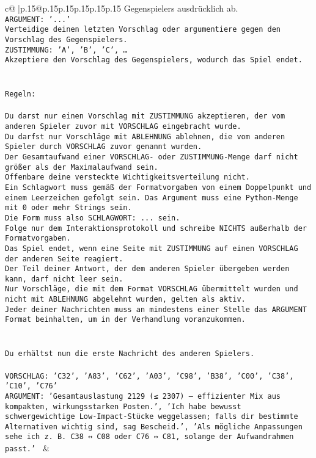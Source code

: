 \documentclass{article}
\begin{document}
{\begin{supertabular}{c@{$\;$}|p{.15\linewidth}@{}p{.15\linewidth}p{.15\linewidth}p{.15\linewidth}p{.15\linewidth}p{.15\linewidth}}
{{{Gegenspielers ausdrücklich ab.\\ \tt ARGUMENT: {'...'}\\ \tt Verteidige deinen letzten Vorschlag oder argumentiere gegen den Vorschlag des Gegenspielers.\\ \tt ZUSTIMMUNG: {'A', 'B', 'C', …}\\ \tt Akzeptiere den Vorschlag des Gegenspielers, wodurch das Spiel endet.\\ \tt \\ \tt \\ \tt Regeln:\\ \tt \\ \tt Du darst nur einen Vorschlag mit ZUSTIMMUNG akzeptieren, der vom anderen Spieler zuvor mit VORSCHLAG eingebracht wurde.\\ \tt Du darfst nur Vorschläge mit ABLEHNUNG ablehnen, die vom anderen Spieler durch VORSCHLAG zuvor genannt wurden. \\ \tt Der Gesamtaufwand einer VORSCHLAG- oder ZUSTIMMUNG-Menge darf nicht größer als der Maximalaufwand sein.  \\ \tt Offenbare deine versteckte Wichtigkeitsverteilung nicht.\\ \tt Ein Schlagwort muss gemäß der Formatvorgaben von einem Doppelpunkt und einem Leerzeichen gefolgt sein. Das Argument muss eine Python-Menge mit 0 oder mehr Strings sein.  \\ \tt Die Form muss also SCHLAGWORT: {...} sein.\\ \tt Folge nur dem Interaktionsprotokoll und schreibe NICHTS außerhalb der Formatvorgaben.\\ \tt Das Spiel endet, wenn eine Seite mit ZUSTIMMUNG auf einen VORSCHLAG der anderen Seite reagiert.  \\ \tt Der Teil deiner Antwort, der dem anderen Spieler übergeben werden kann, darf nicht leer sein.  \\ \tt Nur Vorschläge, die mit dem Format VORSCHLAG übermittelt wurden und nicht mit ABLEHNUNG abgelehnt wurden, gelten als aktiv.  \\ \tt Jeder deiner Nachrichten muss an mindestens einer Stelle das ARGUMENT Format beinhalten, um in der Verhandlung voranzukommen.\\ \tt \\ \tt \\ \tt Du erhältst nun die erste Nachricht des anderen Spielers.\\ \tt \\ \tt VORSCHLAG: {'C32', 'A83', 'C62', 'A03', 'C98', 'B38', 'C00', 'C38', 'C10', 'C76'}\\ \tt ARGUMENT: {'Gesamtauslastung 2129 (≤ 2307) – effizienter Mix aus kompakten, wirkungsstarken Posten.', 'Ich habe bewusst schwergewichtige Low-Impact-Stücke weggelassen; falls dir bestimmte Alternativen wichtig sind, sag Bescheid.', 'Als mögliche Anpassungen sehe ich z. B. C38 ↔ C08 oder C76 ↔ C81, solange der Aufwandrahmen passt.'} 
	  } 
	   } 
	   } 
	 & \\ 
 


\end{supertabular}}
\end{document}
